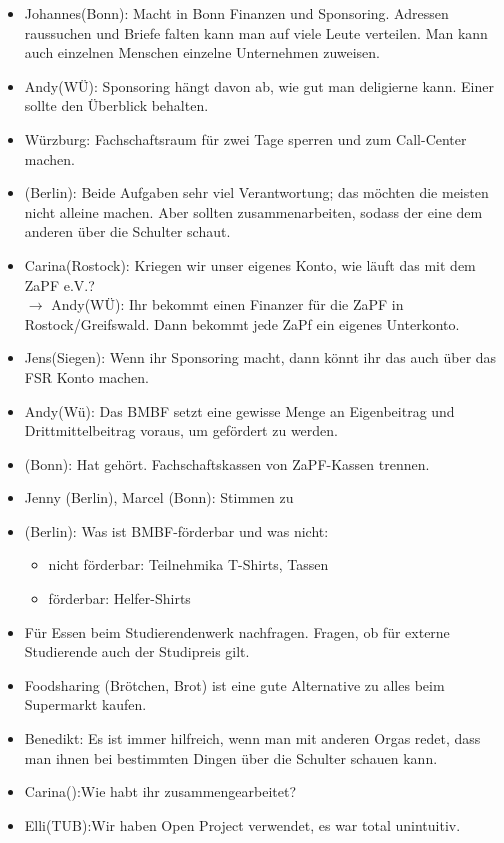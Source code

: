 \begin{itemize}
      \item Johannes(Bonn): Macht in Bonn Finanzen und Sponsoring. Adressen raussuchen und Briefe falten kann man auf viele Leute verteilen. Man kann auch einzelnen Menschen einzelne Unternehmen zuweisen.
      \item Andy(WÜ): Sponsoring hängt davon ab, wie gut man deligierne kann. Einer sollte den Überblick behalten.
      \item Würzburg: Fachschaftsraum für zwei Tage sperren und zum Call-Center machen.
      \item (Berlin): Beide Aufgaben sehr viel Verantwortung; das möchten die meisten nicht alleine machen. Aber sollten zusammenarbeiten, sodass der eine dem anderen über die Schulter schaut.
      \item Carina(Rostock): Kriegen wir unser eigenes Konto, wie läuft das mit dem ZaPF e.V.? \\
          $\rightarrow$ Andy(WÜ): Ihr bekommt einen Finanzer für die ZaPF in Rostock/Greifswald. Dann bekommt jede ZaPf ein eigenes Unterkonto.
      \item Jens(Siegen): Wenn ihr Sponsoring macht, dann könnt ihr das auch über das FSR Konto machen.
      \item Andy(Wü): Das BMBF setzt eine gewisse Menge an Eigenbeitrag und Drittmittelbeitrag voraus, um gefördert zu werden.
      \item (Bonn): Hat gehört. Fachschaftskassen von ZaPF-Kassen trennen.
      \item Jenny (Berlin), Marcel (Bonn): Stimmen zu
      \item (Berlin): Was ist BMBF-förderbar und was nicht:
         \begin{itemize}
           \item nicht förderbar: Teilnehmika T-Shirts, Tassen
           \item förderbar: Helfer-Shirts
         \end{itemize}
      \item Für Essen beim Studierendenwerk nachfragen. Fragen, ob für externe Studierende auch der Studipreis gilt.
      \item Foodsharing (Brötchen, Brot) ist eine gute Alternative zu alles beim Supermarkt kaufen.
      \item Benedikt: Es ist immer hilfreich, wenn man mit anderen Orgas redet, dass man ihnen bei bestimmten Dingen über die Schulter schauen kann.
      \item Carina():Wie habt ihr zusammengearbeitet?
      \item Elli(TUB):Wir haben Open Project verwendet, es war total unintuitiv.

\end{itemize}
